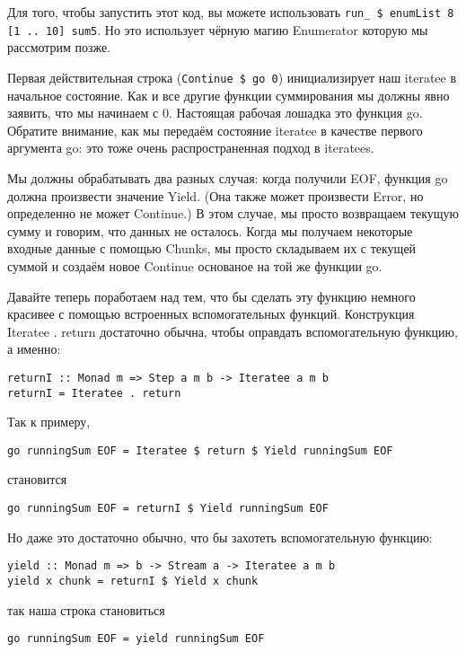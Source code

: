 Для того, чтобы запустить этот код, вы можете использовать \lstinline!run_ $ enumList 8 [1 .. 10] sum5!. Но это использует чёрную магию Enumerator которую мы рассмотрим позже.

Первая действительная строка (\lstinline!Continue $ go 0!) инициализирует наш iteratee в начальное состояние. Как и все другие функции суммирования мы должны явно заявить, что мы начинаем с 0. Настоящая рабочая лошадка это функция go. Обратите внимание, как мы передаём состояние iteratee в качестве первого аргумента go: это тоже очень распространенная подход в iteratees.

Мы должны обрабатывать два разных случая: когда получили EOF, функция go должна произвести значение Yield. (Она также может произвести Error, но определенно не может Continue.) В этом случае, мы просто возвращаем текущую сумму и говорим, что данных не осталось. Когда мы получаем некоторые входные данные с помощью Chunks, мы просто складываем их с текущей суммой и создаём новое Continue основаное на той же функции go.

Давайте теперь поработаем над тем, что бы сделать эту функцию немного красивее с помощью встроенных вспомогательных функций. Конструкция Iteratee . return достаточно обычна, чтобы оправдать вспомогательную функцию, а именно:

\begin{lstlisting}
returnI :: Monad m => Step a m b -> Iteratee a m b
returnI = Iteratee . return
\end{lstlisting}

Так к примеру,

\begin{lstlisting}
go runningSum EOF = Iteratee $ return $ Yield runningSum EOF
\end{lstlisting}

становится

\begin{lstlisting}
go runningSum EOF = returnI $ Yield runningSum EOF
\end{lstlisting}

Но даже это достаточно обычно, что бы захотеть вспомогательную функцию:

\begin{lstlisting}
yield :: Monad m => b -> Stream a -> Iteratee a m b
yield x chunk = returnI $ Yield x chunk
\end{lstlisting}

так наша строка становиться

\begin{lstlisting}
go runningSum EOF = yield runningSum EOF
\end{lstlisting}

